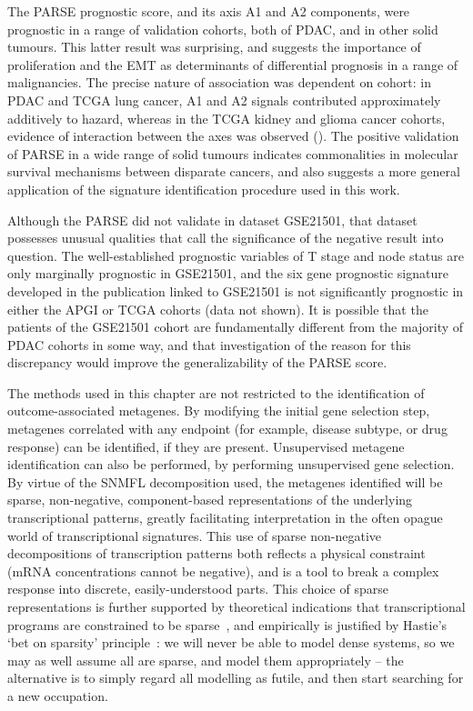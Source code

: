 \documentclass[dissertation.tex]{subfiles}
\begin{document}
The \gls{PARSE} prognostic score, and its axis A1 and A2 components, were prognostic in a range of validation cohorts, both of \gls{PDAC}, and in other solid tumours.  This latter result was surprising, and suggests the importance of proliferation and the \gls{EMT} as determinants of differential prognosis in a range of malignancies.  The precise nature of association was dependent on cohort: in \gls{PDAC} and \gls{TCGA} lung cancer, A1 and A2 signals contributed approximately additively to hazard, whereas in the \gls{TCGA} kidney and glioma cancer cohorts, evidence of interaction between the axes was observed ().  The positive validation of \gls{PARSE} in a wide range of solid tumours indicates commonalities in molecular survival mechanisms between disparate cancers, and also suggests a more general application of the signature identification procedure used in this work.

Although the \gls{PARSE} did not validate in dataset GSE21501, that dataset possesses unusual qualities that call the significance of the negative result into question.  The well-established prognostic variables of T stage and node status are only marginally prognostic in GSE21501, and the six gene prognostic signature developed in the publication linked to GSE21501 \cite{Stratford2010} is not significantly prognostic in either the \gls{APGI} or \gls{TCGA} cohorts (data not shown).  It is possible that the  patients of the GSE21501 cohort are fundamentally different from the majority of \gls{PDAC} cohorts in some way, and that investigation of the reason for this discrepancy would improve the generalizability of the \gls{PARSE} score.

The methods used in this chapter are not restricted to the identification of outcome-associated metagenes.  By modifying the initial gene selection step, metagenes correlated with any endpoint (for example, disease subtype, or drug response) can be identified, if they are present.  Unsupervised metagene identification can also be performed, by performing unsupervised gene selection.  By virtue of the \gls{SNMFL} decomposition used, the metagenes identified will be sparse, non-negative, component-based representations of the underlying transcriptional patterns, greatly facilitating interpretation in the often opague world of transcriptional signatures.  This use of sparse non-negative decompositions of transcription patterns both reflects a physical constraint (mRNA concentrations cannot be negative), and is a tool to break a complex response into discrete, easily-understood parts.  This choice of sparse representations is further supported by theoretical indications that transcriptional programs are constrained to be sparse~\cite{Leclerc2008}, and empirically is justified by Hastie's `bet on sparsity' principle~\cite{Hastie01statisticallearning}: we will never be able to model dense systems, so we may as well assume all are sparse, and model them appropriately -- the alternative is to simply regard all modelling as futile, and then start searching for a new occupation.
\end{document}
